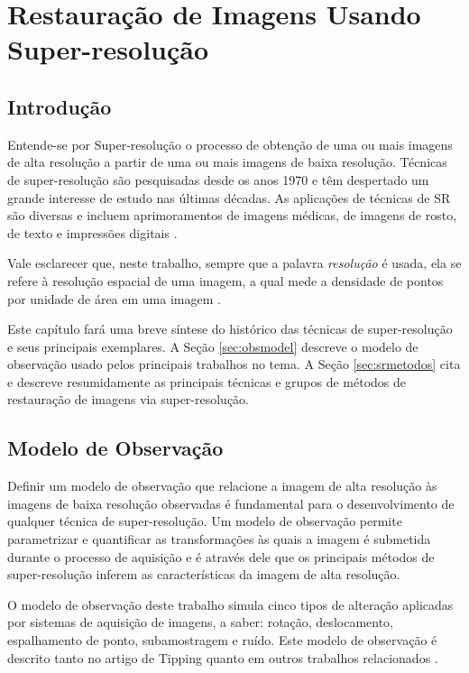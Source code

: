 \chapter{Restauração de Imagens Usando Super-resolução}
\label{chap:superRes}
\section{Introdução}
Entende-se por Super-resolução o processo de obtenção de uma ou mais imagens de alta resolução a partir de uma ou mais imagens de baixa resolução.
Técnicas de super-resolução são pesquisadas desde os anos 1970 e têm despertado um grande interesse de estudo nas últimas décadas.
As aplicações de técnicas de SR são diversas e incluem aprimoramentos de imagens médicas, de imagens de rosto, de texto e impressões digitais \cite{nasrollahi2014super}.

Vale esclarecer que, neste trabalho, sempre que a palavra \textit{resolução} é usada,
ela se refere à resolução espacial de uma imagem, a qual mede a densidade de pontos por
unidade de área em uma imagem \cite{zibetti2007super}.

Este capítulo fará uma breve síntese do histórico das técnicas de super-resolução e seus
principais exemplares.
A Seção \ref{sec:obsmodel} descreve o modelo de observação usado pelos principais
trabalhos no tema. A Seção \ref{sec:srmetodos} cita e descreve resumidamente as
principais técnicas e grupos de métodos de restauração de imagens via super-resolução. 

\section{\label{sec:obsmodel}Modelo de Observação}


Definir um modelo de observação que relacione a imagem de alta resolução às imagens
de baixa resolução observadas é fundamental para o desenvolvimento de qualquer técnica
de super-resolução. Um modelo de observação permite parametrizar e quantificar as
transformações às quais a imagem é submetida durante o processo de aquisição e é
através dele que os principais métodos de super-resolução inferem as características
da imagem de alta resolução.

O modelo de observação deste trabalho simula cinco tipos de alteração aplicadas por
sistemas de aquisição de imagens, a saber: rotação, deslocamento, espalhamento de
ponto, subamostragem e ruído.
Este modelo de observação é descrito tanto no artigo de Tipping
\cite{tipping2003bayesian} quanto em outros trabalhos relacionados
\cite{pickup2007bayesian, Capel01a}.

